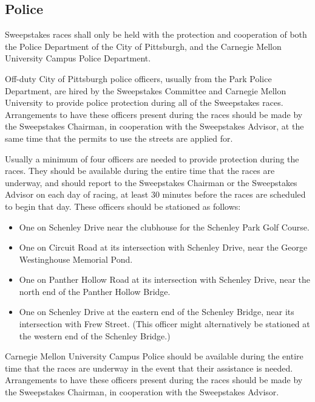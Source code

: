 \subsection{Police}

	Sweepstakes races shall only be held with the protection and cooperation of
	both the Police Department of the City of Pittsburgh, and the Carnegie Mellon
	University Campus Police Department.

	Off-duty City of Pittsburgh police officers, usually from the Park Police
	Department, are hired by the Sweepstakes Committee and Carnegie Mellon
	University to provide police protection during all of the Sweepstakes races.
	Arrangements to have these officers present during the races should be made by
	the Sweepstakes Chairman, in cooperation with the Sweepstakes Advisor, at the
	same time that the permits to use the streets are applied for.

	Usually a minimum of four officers are needed to provide protection during the
	races. They should be available during the entire time that the races are
	underway, and should report to the Sweepstakes Chairman or the Sweepstakes
	Advisor on each day of racing, at least 30 minutes before the races are
	scheduled to begin that day. These officers should be stationed as follows:

	\begin{itemize}

		\item One on Schenley Drive near the clubhouse for the Schenley Park Golf
		Course.

		\item One on Circuit Road at its intersection with Schenley Drive, near the
		George Westinghouse Memorial Pond.

		\item One on Panther Hollow Road at its intersection with Schenley Drive,
		near the north end of the Panther Hollow Bridge.

		\item One on Schenley Drive at the eastern end of the Schenley Bridge, near
		its intersection with Frew Street. (This officer might alternatively be
		stationed at the western end of the Schenley Bridge.)

	\end{itemize}

	Carnegie Mellon University Campus Police should be available during the entire
	time that the races are underway in the event that their assistance is needed.
	Arrangements to have these officers present during the races should be made by
	the Sweepstakes Chairman, in cooperation with the Sweepstakes Advisor.

